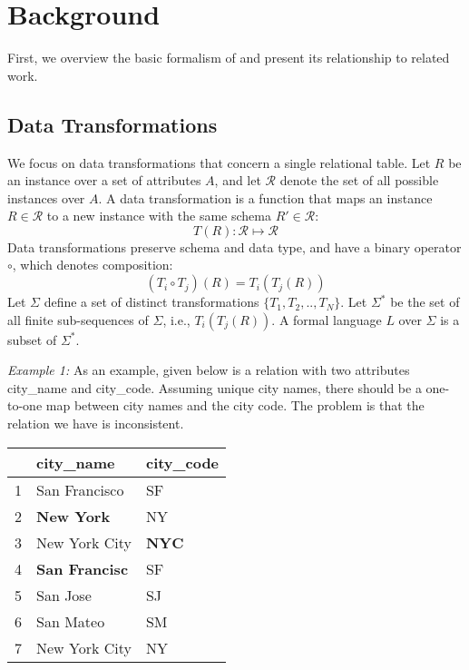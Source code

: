 \section{Background}
First, we overview the basic formalism of \sys and present its relationship to related work.

\subsection{Data Transformations}
We focus on data transformations that concern a single relational table. 
Let $R$ be an instance over a set of attributes $A$, and let $\mathcal{R}$ denote the set of all possible instances over $A$.
A data transformation is a function that maps an instance $R \in \mathcal{R}$ to a new instance with the same schema $R' \in \mathcal{R}$: 
\[T(R): \mathcal{R} \mapsto  \mathcal{R}\]
Data transformations preserve schema and data type, and have a binary operator $\circ$, which denotes composition:
\[
(T_i \circ T_j)(R) =  T_i(T_j(R))
\]
Let $\Sigma$ define a set of distinct transformations $\{T_1, T_2,..,T_N\}$.
Let $\Sigma^*$ be the set of all finite sub-sequences of $\Sigma$, i.e., $T_i(T_j(R))$.
A formal language $L$ over  $\Sigma$ is a subset of $\Sigma^*$.


\vspace{0.5em} \noindent \emph{Example 1: } As an example, given below is a relation with two attributes \textsf{city\_name} and \textsf{city\_code}. 
Assuming unique city names, there should be a one-to-one map between city names and the city code. The problem is that the relation we have is inconsistent.

\begin{table}[ht!]
\centering
\label{my-label}
\begin{tabular}{|l|l|l|}
\hline
\rowcolor[HTML]{000000} 
& {\color[HTML]{FFFFFF} city\_name}            & {\color[HTML]{FFFFFF} city\_code}   \\ \hline
1 & San Francisco                                & SF                                  \\ \hline
2& {\color[HTML]{FE0000} \textbf{New York}}     & NY                                  \\ \hline
3 & New York City                                & {\color[HTML]{FE0000} \textbf{NYC}} \\ \hline
4 & {\color[HTML]{FE0000} \textbf{San Francisc}} & SF                                  \\ \hline
5 & San Jose                                     & SJ                                  \\ \hline
6 & San Mateo                                    & SM                                  \\ \hline
7 & New York City                                & NY                                  \\ \hline
\end{tabular}
\end{table}

